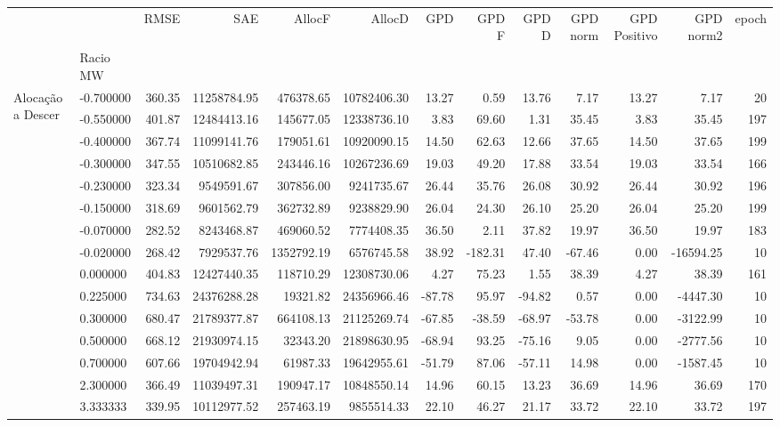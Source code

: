 \begin{tabular}{llrrrrrrrrrrr}
\toprule
 &  & RMSE & SAE & AllocF & AllocD & GPD & GPD F & GPD D & GPD norm & GPD Positivo & GPD norm2 & epoch \\
 & Racio MW &  &  &  &  &  &  &  &  &  &  &  \\
\midrule
\multirow[t]{15}{*}{Alocação a Descer} & -0.700000 & 360.35 & 11258784.95 & 476378.65 & 10782406.30 & 13.27 & 0.59 & 13.76 & 7.17 & 13.27 & 7.17 & 20 \\
 & -0.550000 & 401.87 & 12484413.16 & 145677.05 & 12338736.10 & 3.83 & 69.60 & 1.31 & 35.45 & 3.83 & 35.45 & 197 \\
 & -0.400000 & 367.74 & 11099141.76 & 179051.61 & 10920090.15 & 14.50 & 62.63 & 12.66 & 37.65 & 14.50 & 37.65 & 199 \\
 & -0.300000 & 347.55 & 10510682.85 & 243446.16 & 10267236.69 & 19.03 & 49.20 & 17.88 & 33.54 & 19.03 & 33.54 & 166 \\
 & -0.230000 & 323.34 & 9549591.67 & 307856.00 & 9241735.67 & 26.44 & 35.76 & 26.08 & 30.92 & 26.44 & 30.92 & 196 \\
 & -0.150000 & 318.69 & 9601562.79 & 362732.89 & 9238829.90 & 26.04 & 24.30 & 26.10 & 25.20 & 26.04 & 25.20 & 199 \\
 & -0.070000 & 282.52 & 8243468.87 & 469060.52 & 7774408.35 & 36.50 & 2.11 & 37.82 & 19.97 & 36.50 & 19.97 & 183 \\
 & -0.020000 & 268.42 & 7929537.76 & 1352792.19 & 6576745.58 & 38.92 & -182.31 & 47.40 & -67.46 & 0.00 & -16594.25 & 10 \\
 & 0.000000 & 404.83 & 12427440.35 & 118710.29 & 12308730.06 & 4.27 & 75.23 & 1.55 & 38.39 & 4.27 & 38.39 & 161 \\
 & 0.225000 & 734.63 & 24376288.28 & 19321.82 & 24356966.46 & -87.78 & 95.97 & -94.82 & 0.57 & 0.00 & -4447.30 & 10 \\
 & 0.300000 & 680.47 & 21789377.87 & 664108.13 & 21125269.74 & -67.85 & -38.59 & -68.97 & -53.78 & 0.00 & -3122.99 & 10 \\
 & 0.500000 & 668.12 & 21930974.15 & 32343.20 & 21898630.95 & -68.94 & 93.25 & -75.16 & 9.05 & 0.00 & -2777.56 & 10 \\
 & 0.700000 & 607.66 & 19704942.94 & 61987.33 & 19642955.61 & -51.79 & 87.06 & -57.11 & 14.98 & 0.00 & -1587.45 & 10 \\
 & 2.300000 & 366.49 & 11039497.31 & 190947.17 & 10848550.14 & 14.96 & 60.15 & 13.23 & 36.69 & 14.96 & 36.69 & 170 \\
 & 3.333333 & 339.95 & 10112977.52 & 257463.19 & 9855514.33 & 22.10 & 46.27 & 21.17 & 33.72 & 22.10 & 33.72 & 197 \\

\end{tabular}
